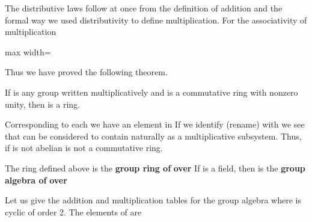 \documentclass[11pt,oneside]{article}
\begin{document}
\begin{BookBody}

The distributive laws follow at once from the definition of addition and the formal way we used distributivity to define multiplication. For the associativity of multiplication

\begin{center}\begin{adjustbox}{max width=\linewidth}\end{adjustbox}\end{center}

\noindent Thus we have proved the following theorem.

 If  is any group written multiplicatively and  is a commutative ring with nonzero unity, then  is a ring.

Corresponding to each  we have an element  in  If we identify (rename)  with  we see that  can be considered to contain  naturally as a multiplicative subsystem. Thus, if  is not abelian is not a commutative ring.

 The ring  defined above is the\textbf{ group ring of}  \textbf{over}  If  is a field, then  is the \textbf{group algebra of}  \textbf{over} \BookEnd{\blacksquare}

 Let us give the addition and multiplication tables for the group algebra  where  is cyclic of order 2. The elements of  are


\end{BookBody}
\end{document}

